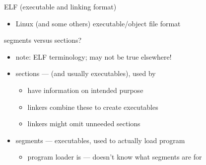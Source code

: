 \begin{frame}{ELF (executable and linking format)}
\begin{itemize}
\item Linux {\small (and some others)} executable/object file format
\end{itemize}
\end{frame}

\begin{frame}{segments versus sections?}
\begin{itemize}
    \item note: ELF terminology; may not be true elsewhere!
    \item sections ---  {\small (and usually executables)}, used by 
        \begin{itemize}
        \item have information on intended purpose
        \item linkers combine these to create executables
        \item linkers might omit unneeded sections
        \end{itemize}
    \item segments --- executables, used to actually load program
        \begin{itemize}
        \item program loader is  --- doesn't know what segments are for
        \end{itemize}
\end{itemize}
\end{frame}

